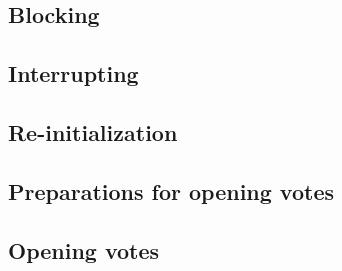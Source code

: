 \subsection{Blocking}\label{sec4:blocking}

\subsection{Interrupting}\label{sec4:interrupting}

\subsection{Re-initialization}\label{sec4:re-initialization}

\subsection{Preparations for opening votes}\label{sec4:prep-open-votes}

\subsection{Opening votes}\label{sec4:opening-votes} 



